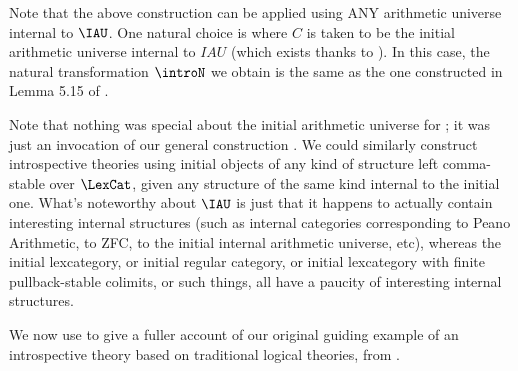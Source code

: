 \begin{observation}
Note that the above construction can be applied using ANY arithmetic universe internal to $\IAU$. One natural choice is where $C$ is taken to be the initial arithmetic universe internal to $IAU$ (which exists thanks to ). In this case, the natural transformation $\introN$ we obtain is the same as the one constructed in Lemma 5.15 of \autocite{van2020g}.
\end{observation}

Note that nothing was special about the initial arithmetic universe for ; it was just an invocation of our general construction . We could similarly construct introspective theories using initial objects of any kind of structure left comma-stable over $\LexCat$, given any structure of the same kind internal to the initial one. What's noteworthy about $\IAU$ is just that it happens to actually contain interesting internal structures (such as internal categories corresponding to Peano Arithmetic, to ZFC, to the initial internal arithmetic universe, etc), whereas the initial lexcategory, or initial regular category, or initial lexcategory with finite pullback-stable colimits, or such things, all have a paucity of interesting internal structures.

We now use  to give a fuller account of our original guiding example of an introspective theory based on traditional logical theories, from .

